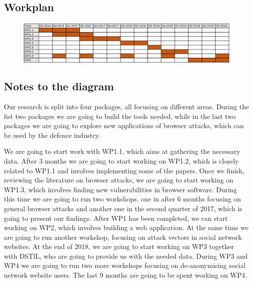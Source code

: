 \documentclass[a4paper,11pt]{article}
\begin{document}
\newpage
\begin{landscape}
\section*{Workplan}

\begin{figure}[h]
\centering
\includegraphics[width=25cm]{gantt.png}
\end{figure}

\subsection*{Notes to the diagram}

Our research is split into four packages, all focusing on different areas. During the fist two packages we are going to build the tools needed, while in the last two packages we are going to explore new applications of browser attacks, which can be used by the defence industry.

We are going to start work with WP1.1, which aims at gathering the necessary data. After 3 months we are going to start working on WP1.2, which is closely related to WP1.1 and involves implementing some of the papers. Once we finish, reviewing the literature on browser attacks, we are going to start working on WP1.3, which involves finding new vulnerabilities in browser software. During this time we are going to run two workshops, one in after 6 months focusing on general browser attacks and another one in the second quarter of 2017, which is going to present our findings. After WP1 has been completed, we can start working on WP2, which involves building a web application. At the same time we are going to run another workshop, focusing on attack vectors in social network websites. At the end of 2018, we are going to start working on WP3 together with DSTlL, who are going to provide us with the needed data. During WP3 and WP4 we are going to run two more workshops focusing on de-anonymising social network website users. The last 9 months are going to be spent working on WP4. 


\end{landscape}
\end{document}
